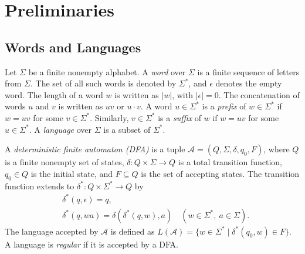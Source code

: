 \documentclass{ieice-tecrep}
\begin{document}
\section{Preliminaries}\label{preliminaries}

\subsection{Words and Languages}\label{minimal-dfa-preliminaries}

Let \(\Sigma\) be a finite nonempty alphabet. A \emph{word} over \(\Sigma\)
is a finite sequence of letters from \(\Sigma\). The set of all such
words is denoted by \(\Sigma^*\), and \(\epsilon\) denotes the empty
word. The length of a word \(w\) is written as \(|w|\), with
\(|\epsilon|=0\). The concatenation of words \(u\) and \(v\) is
written as \(uv\) or \(u\cdot v\). 
A word \(u \in \Sigma^*\) is a \emph{prefix} of \(w \in \Sigma^*\) if \(w=uv\) for some
\(v\in\Sigma^*\). 
Similarly, \(v \in \Sigma^*\) is a \emph{suffix} of \(w\) if \(w=uv\) for some
\(u\in\Sigma^*\). A \emph{language} over \(\Sigma\) is a
subset of \(\Sigma^*\). 

A \emph{deterministic finite automaton (DFA)} is a tuple
\(\mathcal{A}=(Q,\Sigma,\delta,q_0,F)\), where \(Q\) is a finite
nonempty set of states, \(\delta:Q\times\Sigma\to Q\) is a total
transition function, \(q_0\in Q\) is the initial state, and
\(F\subseteq Q\) is the set of accepting states. The transition
function extends to \(\delta^*:Q\times\Sigma^*\to Q\) by
\[
\begin{aligned}
&\delta^*(q,\epsilon)=q,\\
&\delta^*(q,wa)=\delta(\delta^*(q,w),a)
\quad(w\in\Sigma^*,\ a\in\Sigma).
\end{aligned}
\]
The language accepted by \(\mathcal{A}\) is defined as
\(L(\mathcal{A})=\{w\in\Sigma^*\mid\delta^*(q_0,w)\in F\}\). A language is \emph{regular} if it is accepted by a DFA. 
\end{document}
